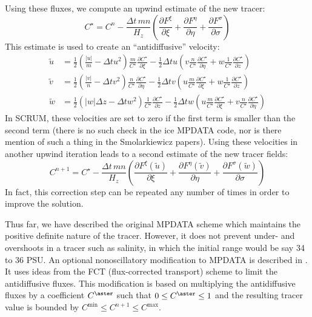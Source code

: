 Using these fluxes, we compute an upwind estimate of the new
tracer:
\begin{equation}
   C^{\star} = C^n - \frac{\Delta t\, mn}{H_z} \left(
   \frac{\partial F^\xi}{\partial \xi} +
   \frac{\partial F^\eta}{\partial \eta} +
   \frac{\partial F^\sigma}{\partial \sigma} \right)
\end{equation}
This estimate is used to create an ``antidiffusive'' velocity:
\begin{align}
   \tilde{u} &= \frac{1}{2}
      \left( \frac{|u|}{m} - \Delta t u^2 \right)
      \frac{m}{C^\star} \frac{\partial C^\star}{\partial \xi} -
      \frac{1}{2} \Delta t u \left( v \frac{n}{C^\star} 
      \frac{\partial C^\star}{\partial \eta} +
      w \frac{1}{C^\star} \frac{\partial C^\star}{\partial z}
      \right) \label{antiu} \\
   \tilde{v} &= \frac{1}{2}
      \left( \frac{|v|}{n} - \Delta t v^2 \right)
      \frac{n}{C^\star} \frac{\partial C^\star}{\partial \eta} -
      \frac{1}{2} \Delta t v \left( u \frac{m}{C^\star} 
      \frac{\partial C^\star}{\partial \xi} +
      w \frac{1}{C^\star} \frac{\partial C^\star}{\partial z}
      \right) \label{antiv} \\
   \tilde{w} &= \frac{1}{2}
      \left( |w| \Delta z - \Delta t w^2 \right)
      \frac{1}{C^\star} \frac{\partial C^\star}{\partial z} -
      \frac{1}{2} \Delta t w \left( u \frac{m}{C^\star} 
      \frac{\partial C^\star}{\partial \xi} +
      v \frac{n}{C^\star} \frac{\partial C^\star}{\partial \eta}
      \right) \label{antiw}
\end{align}
In SCRUM, these velocities are set to zero if the first term is smaller
than the second term (there is no such check in the ice MPDATA code,
nor is there mention of such a thing in the Smolarkiewicz papers).
Using these velocities in another upwind iteration leads to a second
estimate of the new tracer fields:
\begin{equation}
   C^{n+1} = C^\star - \frac{\Delta t\, mn}{H_z} \left(
   \frac{\partial F^\xi(\tilde{u})}{\partial \xi} +
   \frac{\partial F^\eta(\tilde{v})}{\partial \eta} +
   \frac{\partial F^\sigma(\tilde{w})}{\partial \sigma} \right)
\label{antidiff}
\end{equation}
In fact, this correction step can be repeated any number of times in
order to improve the solution.

Thus far, we have described the original MPDATA scheme which
maintains the positive definite nature of the tracer.  However, it does
not prevent under- and overshoots in a tracer such as salinity, in which
the initial range would be say 34 to 36 PSU. An optional nonoscillatory
modification to MPDATA is described in \cite{Smolark90}.
It uses ideas from the FCT (flux-corrected transport) scheme to limit
the antidiffusive fluxes. This modification is based on multiplying the
antidiffusive fluxes by a coefficient $C^\aster$ such that $0 \leq
C^\aster \leq 1$
and the resulting tracer value is bounded by $C^{\min} \leq
C^{n+1} \leq C^{\max}$.
  
